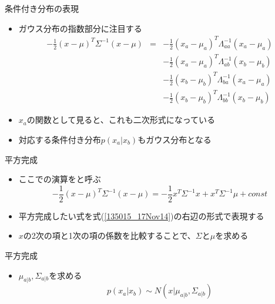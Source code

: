             \begin{frame}{条件付き分布の表現}
             \begin{itemize}
              \item ガウス分布の指数部分に注目する
                    \begin{eqnarray*}
                     -\frac{1}{2}(x - \mu)^{T}\Sigma^{-1}(x-\mu) &= &
                      -\frac{1}{2}(x_a - \mu_a)^{T}\Lambda_{aa}^{-1}(x_a-\mu_a) \\
                     &&-\frac{1}{2}(x_a - \mu_a)^{T}\Lambda_{ab}^{-1}(x_b-\mu_b) \\
                     &&-\frac{1}{2}(x_b - \mu_b)^{T}\Lambda_{ba}^{-1}(x_a-\mu_a) \\
                     &&-\frac{1}{2}(x_b - \mu_b)^{T}\Lambda_{bb}^{-1}(x_b-\mu_b)
                    \end{eqnarray*}
              \item $x_a$の関数として見ると、これも二次形式になっている
              \item 対応する条件付き分布$p(x_a | x_b)$もガウス分布となる
             \end{itemize}
            \end{frame}

              \begin{frame}{平方完成}
               \begin{itemize}
                \item ここでの演算をと呼ぶ
                      \begin{equation}
                       -\frac{1}{2}(x-\mu)^{T}\Sigma^{-1}(x-\mu) = -\frac{1}{2}x^T\Sigma^{-1}x+x^T\Sigma^{-1}\mu + const\label{135015_17Nov14}
                      \end{equation}
                \item 平方完成したい式を式(\ref{135015_17Nov14})の右辺の形式で表現する
                \item $x$の2次の項と1次の項の係数を比較することで、$\Sigma$と$\mu$を求める
               \end{itemize}
              \end{frame}

                \begin{frame}{平方完成}
                 \begin{itemize}
                  \item $\mu_{a|b}, \Sigma_{a|b}$を求める
                        \begin{equation}
                         p(x_a | x_b) \sim N(x | \mu_{a|b}, \Sigma_{a|b})
                        \end{equation}
                 \end{itemize}
                \end{frame}

